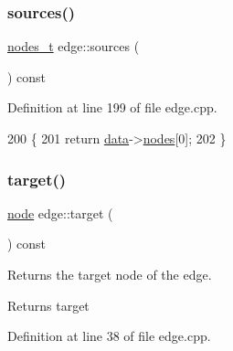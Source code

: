 \subsubsection{\texorpdfstring{sources()}{sources()}}
{\footnotesize\ttfamily \mbox{\hyperlink{edge_8h_a22ac17689106ba21a84e7bc54d1199d6}{nodes\+\_\+t}} edge\+::sources (\begin{DoxyParamCaption}{ }\end{DoxyParamCaption}) const}



Definition at line 199 of file edge.\+cpp.


\begin{DoxyCode}
200 \{
201     \textcolor{keywordflow}{return} \mbox{\hyperlink{classedge_a0ebb6dfa28b77f47529085049352b436}{data}}->\mbox{\hyperlink{classedge__data_a870bbbb05de6c5f63d434db624c55dd4}{nodes}}[0];
202 \}
\end{DoxyCode}
\mbox{\label{classedge_a97563b611261478ee19c6ce055f1a3ee}} 
\subsubsection{\texorpdfstring{target()}{target()}}
{\footnotesize\ttfamily \mbox{\hyperlink{classnode}{node}} edge\+::target (\begin{DoxyParamCaption}{ }\end{DoxyParamCaption}) const}

Returns the target node of the edge.

\begin{DoxyReturn}{Returns}
target 
\end{DoxyReturn}


Definition at line 38 of file edge.\+cpp.


